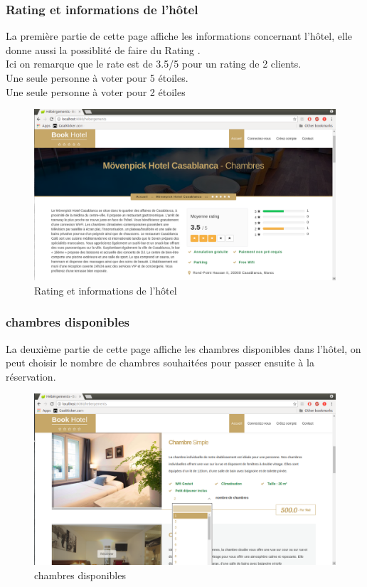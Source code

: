 \documentclass[12pt,a4paper]{report}
\begin{document}
	\subsubsection{Rating et informations de l'hôtel}
	La première partie de cette page affiche les informations concernant l'hôtel, elle donne aussi la possiblité de faire du \guillemotleft Rating \guillemotright.\\
	Ici on remarque que le rate est de 3.5/5 pour un rating de 2 clients.\\
	Une seule personne à voter pour 5 étoiles.\\
	Une seule personne à voter pour 2 étoiles
	\vspace{2cm}
	\begin{figure}[!hbtp]
		\centering
		\includegraphics[scale=0.3]{./graphics/rating.png}
		\caption{Rating et informations de l'hôtel}
		\end{figure}
		\newpage

	\subsubsection{chambres disponibles}
	La deuxième partie de cette page affiche les chambres disponibles dans l'hôtel, on peut choisir le nombre de chambres souhaitées pour passer ensuite à la réservation.\\
	\vspace{2cm}
	\begin{figure}[!hbtp]
		\centering
		\includegraphics[scale=0.3]{./graphics/hebergement.png}
		\caption{chambres disponibles}
		\end{figure}
		\newpage
\end{document}
